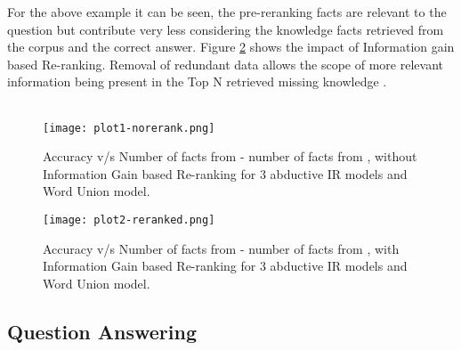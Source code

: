 \documentclass[11pt,a4paper]{article}
\begin{document}
For the above example it can be seen, the pre-reranking facts are relevant to the question but contribute very less considering the knowledge facts retrieved from the corpus  and the correct answer.
Figure \ref{fig:plt2} shows the impact of Information gain based Re-ranking. Removal of redundant data allows the scope of more relevant information being present in the Top N retrieved missing knowledge . \\

\noindent
{} \\

\begin{figure}[h!]
  \texttt{[image: plot1-norerank.png]}
  \caption{Accuracy v/s Number of facts from  - number of facts from , without Information Gain based Re-ranking for 3  abductive IR models and Word Union model. \footnotemark}
  \label{fig:plt1}
\end{figure}
\begin{figure}[h!]
  \texttt{[image: plot2-reranked.png]}
  \caption{Accuracy v/s Number of facts from  - number of facts from , with Information Gain based Re-ranking for 3 abductive IR models and Word Union model. \footnotemark[1]}
  \label{fig:plt2}
\end{figure}
\subsection{Question Answering}
\end{document}
